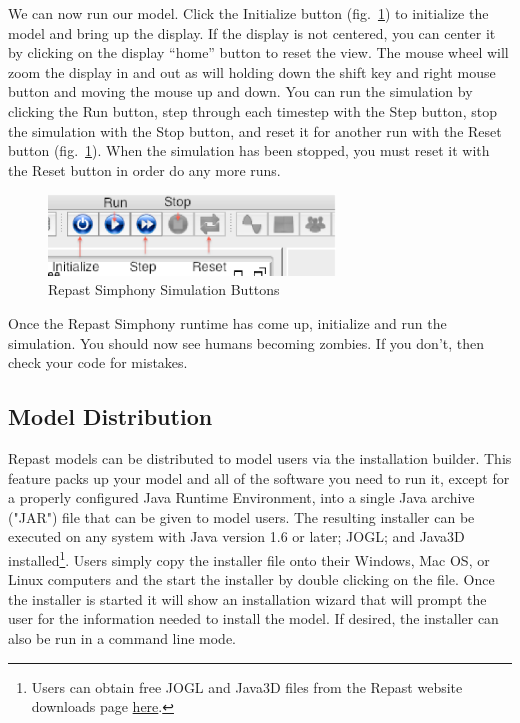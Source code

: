 \documentclass[11pt]{amsart}
\begin{document}
We can now run our model. Click the Initialize button (fig.~\ref{fig:buttons}) to initialize the model and bring up the display. If the display is not centered, you can center it by clicking on the display ``home'' button to reset the view. The mouse wheel will zoom the display in and out as will holding down the shift key and right mouse button and moving the mouse up and down. You can run the simulation by clicking the Run button, step through each timestep with the Step button, stop the simulation with the Stop button, and reset it for another run with the Reset button (fig.~\ref{fig:buttons}). When the simulation has been stopped, you must reset it with the Reset button in order do any more runs.

\begin{figure}[h]
\begin{center}
\vspace{.2in}
\centerline {
\includegraphics[width=3in]{figs/buttons.eps}
}
\caption{Repast Simphony Simulation Buttons}
\label{fig:buttons}
\end{center}
\end{figure}

Once the Repast Simphony runtime has come up, initialize and run the simulation. You should now see humans becoming zombies. If you don't, then check your code for mistakes.

\subsection{Model Distribution}

Repast models can be distributed to model users via the installation builder. This feature packs up your model and all of the software you need to run it, except for a properly configured Java Runtime Environment, into a single Java archive ("JAR") file that can be given to model users. The resulting installer can be executed on any system with Java version 1.6 or later; JOGL; and Java3D installed\footnote{Users can obtain free JOGL and Java3D files from the Repast website downloads page \href{http://repast.sourceforge.net/downloads.html}{here}.}. Users simply copy the installer file onto their Windows, Mac OS, or Linux computers and the start the installer by double clicking on the file. Once the installer is started it will show an installation wizard that will prompt the user for the information needed to install the model. If desired, the installer can also be run in a command line mode.
\end{document}
